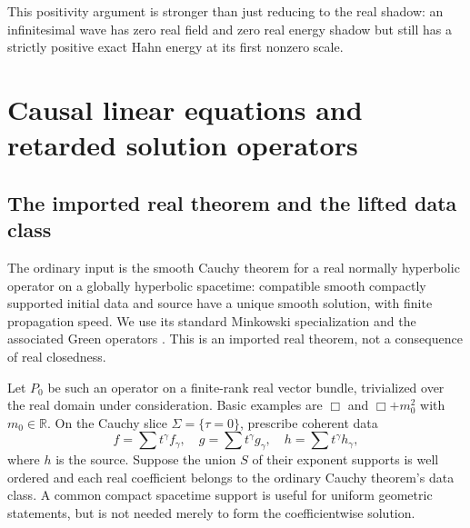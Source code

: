 \documentclass[11pt,letterpaper]{article}
\theoremstyle{definition}
\theoremstyle{remark}
\newcommand{\R}{\mathbb R}\newcommand{\C}{\mathbb C}
\begin{document}
This positivity argument is stronger than just reducing to the real shadow: an infinitesimal wave has zero real field and zero real energy shadow but still has a strictly positive exact Hahn energy at its first nonzero scale.

\section{Causal linear equations and retarded solution operators}\label{vtf:mink:sec:wave}

\subsection{The imported real theorem and the lifted data class}
The ordinary input is the smooth Cauchy theorem for a real normally hyperbolic operator on a globally hyperbolic spacetime: compatible smooth compactly supported initial data and source have a unique smooth solution, with finite propagation speed. We use its standard Minkowski specialization and the associated Green operators \cite{Bar,BGP}. This is an imported real theorem, not a consequence of real closedness.

Let $P_0$ be such an operator on a finite-rank real vector bundle, trivialized over the real domain under consideration. Basic examples are $\Box$ and $\Box+m_0^2$ with $m_0\in\R$. On the Cauchy slice $\Sigma=\{\tau=0\}$, prescribe coherent data
\begin{equation}
 f=\sum t^\gamma f_\gamma,\quad
 g=\sum t^\gamma g_\gamma,\quad
 h=\sum t^\gamma h_\gamma,
\end{equation}
where $h$ is the source. Suppose the union $S$ of their exponent supports is well ordered and each real coefficient belongs to the ordinary Cauchy theorem's data class. A common compact spacetime support is useful for uniform geometric statements, but is not needed merely to form the coefficientwise solution.
\end{document}
